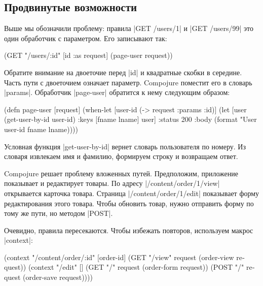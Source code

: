 \subsection{Продвинутые возможности}

Выше мы обозначили проблему: правила \spverb|GET /users/1|
и \spverb|GET /users/99| это один обработчик с параметром. Его записывают так:

\begin{english}
  \begin{clojure}
(GET "/users/:id" [id :as request] (page-user request))
  \end{clojure}
\end{english}

Обратите внимание на двоеточие перед \spverb|id| и квадратные скобки в середине.
Часть пути с двоеточием означает параметр. Compojure поместит его в словарь
\spverb|params|. Обработчик \spverb|page-user| обратится к нему следующим
образом:

\begin{english}
  \begin{clojure}
(defn page-user [request]
  (when-let [user-id (-> request :params :id)]
    (let [user (get-user-by-id user-id)
          {:keys [fname lname]} user]
      {:status 200
       :body (format "User %
                     user-id fname lname)})))
  \end{clojure}
\end{english}

Условная функция \spverb|get-user-by-id| вернет словарь пользователя по
номеру. Из словаря извлекаем имя и фамилию, формируем строку и возвращаем ответ.

Compojure решает проблему вложенных путей. Предположим, приложение показывает и
редактирует товары. По адресу \spverb|/content/order/1/view| открывается
карточка товара. Страница \spverb|/content/order/1/edit| показывает форму
редактирования этого товара. Чтобы обновить товар, нужно отправить форму по тому
же пути, но методом \spverb|POST|.

Очевидно, правила пересекаются. Чтобы избежать повторов, используем макрос
\spverb|context|:

\begin{english}
  \begin{clojure}
(context "/content/order/:id" [order-id]
  (GET  "/view" request (order-view request))
  (context "/edit" []
    (GET  "/" request (order-form request))
    (POST "/" request (order-save request))))
  \end{clojure}
\end{english}

